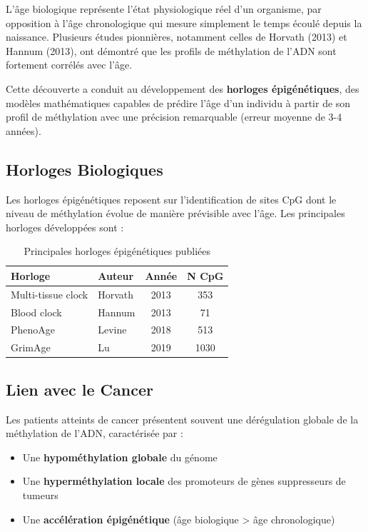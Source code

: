 \documentclass[11pt,a4paper]{article}
\begin{document}
L'âge biologique représente l'état physiologique réel d'un organisme, par opposition à l'âge 
chronologique qui mesure simplement le temps écoulé depuis la naissance. Plusieurs études 
pionnières, notamment celles de Horvath (2013) et Hannum (2013), ont démontré que les profils 
de méthylation de l'ADN sont fortement corrélés avec l'âge.

Cette découverte a conduit au développement des \textbf{horloges épigénétiques}, des modèles 
mathématiques capables de prédire l'âge d'un individu à partir de son profil de méthylation 
avec une précision remarquable (erreur moyenne de 3-4 années).

\subsection{Horloges Biologiques}

Les horloges épigénétiques reposent sur l'identification de sites CpG dont le niveau de 
méthylation évolue de manière prévisible avec l'âge. Les principales horloges développées sont :

\begin{table}[htbp]
\centering
\begin{tabular}{llcc}
\hline
\textbf{Horloge} & \textbf{Auteur} & \textbf{Année} & \textbf{N CpG} \\
\hline
Multi-tissue clock & Horvath & 2013 & 353 \\
Blood clock & Hannum & 2013 & 71 \\
PhenoAge & Levine & 2018 & 513 \\
GrimAge & Lu & 2019 & 1030 \\
\hline
\end{tabular}
\caption{Principales horloges épigénétiques publiées}
\label{tab:clocks}
\end{table}

\subsection{Lien avec le Cancer}

Les patients atteints de cancer présentent souvent une dérégulation globale de la méthylation 
de l'ADN, caractérisée par :
\begin{itemize}
    \item Une \textbf{hypométhylation globale} du génome
    \item Une \textbf{hyperméthylation locale} des promoteurs de gènes suppresseurs de tumeurs
    \item Une \textbf{accélération épigénétique} (âge biologique > âge chronologique)
\end{itemize}
\end{document}
